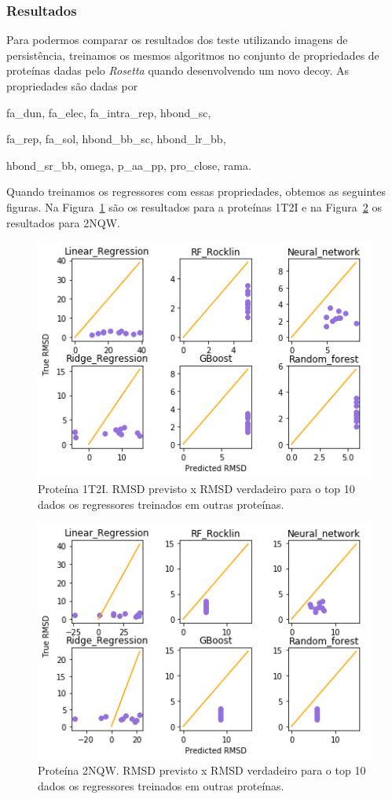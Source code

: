 \subsubsection{Resultados}

Para podermos comparar os resultados dos teste utilizando imagens de persistência, 
treinamos os mesmos algoritmos no conjunto de propriedades de proteínas dadas pelo \textit{Rosetta} 
quando desenvolvendo um novo decoy. As propriedades são dadas por
\begin{center}
    fa\_dun, fa\_elec, fa\_intra\_rep, hbond\_sc,

    fa\_rep, fa\_sol, hbond\_bb\_sc, hbond\_lr\_bb,

    hbond\_sr\_bb, omega, p\_aa\_pp, pro\_close, rama.
\end{center}
Quando treinamos os regressores com essas propriedades, obtemos as seguintes figuras. 
Na Figura~\ref{fig:res1t2i} são os resultados para a proteínas 1T2I e na Figura~\ref{fig:res2nqw} 
os resultados para 2NQW.

\begin{figure}[!htbp]
    \centering
    \includegraphics[width=.7\linewidth]{images/relatorio/res1t2i.png}
    \caption{Proteína 1T2I. RMSD previsto x RMSD verdadeiro para o top 10 dados os 
             regressores treinados em outras proteínas.}
    \label{fig:res1t2i}
    \fautor
\end{figure}

\begin{figure}[!htbp]
    \centering
    \includegraphics[width=.7\linewidth]{images/relatorio/res2nqw.png}
    \caption{Proteína 2NQW. RMSD previsto x RMSD verdadeiro para o top 10 dados os 
             regressores treinados em outras proteínas.}
    \label{fig:res2nqw}
    \fautor
\end{figure}

